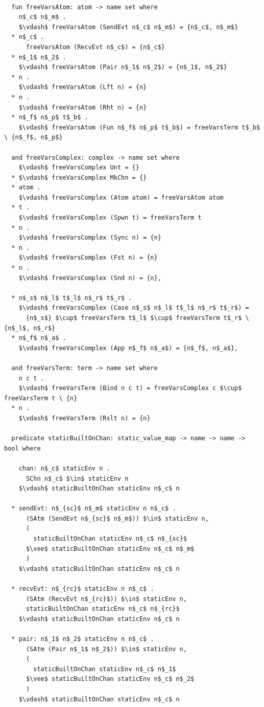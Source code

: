 \documentclass[letterpaper, 11pt]{report}
\begin{document}
\begin{lstlisting}[language=logic, mathescape]

  fun freeVarsAtom: atom -> name set where
    n$_c$ n$_m$ .
    $\vdash$ freeVarsAtom (SendEvt n$_c$ n$_m$) = {n$_c$, n$_m$}
  * n$_c$ .
      freeVarsAtom (RecvEvt n$_c$) = {n$_c$}
  * n$_1$ n$_2$ .
    $\vdash$ freeVarsAtom (Pair n$_1$ n$_2$) = {n$_1$, n$_2$}
  * n .
    $\vdash$ freeVarsAtom (Lft n) = {n}
  * n .
    $\vdash$ freeVarsAtom (Rht n) = {n}
  * n$_f$ n$_p$ t$_b$ .
    $\vdash$ freeVarsAtom (Fun n$_f$ n$_p$ t$_b$) = freeVarsTerm t$_b$ \ {n$_f$, n$_p$}
  
  and freeVarsComplex: complex -> name set where
    $\vdash$ freeVarsComplex Unt = {}
  * $\vdash$ freeVarsComplex MkChn = {}
  * atom .
    $\vdash$ freeVarsComplex (Atom atom) = freeVarsAtom atom
  * t .
    $\vdash$ freeVarsComplex (Spwn t) = freeVarsTerm t
  * n .
    $\vdash$ freeVarsComplex (Sync n) = {n}
  * n .
    $\vdash$ freeVarsComplex (Fst n) = {n}
  * n .
    $\vdash$ freeVarsComplex (Snd n) = {n},

  * n$_s$ n$_l$ t$_l$ n$_r$ t$_r$ .
    $\vdash$ freeVarsComplex (Case n$_s$ n$_l$ t$_l$ n$_r$ t$_r$) = 
      {n$_s$} $\cup$ freeVarsTerm t$_l$ $\cup$ freeVarsTerm t$_r$ \ {n$_l$, n$_r$}
  * n$_f$ n$_a$ .
    $\vdash$ freeVarsComplex (App n$_f$ n$_a$) = {n$_f$, n$_a$},
  
  and freeVarsTerm: term -> name set where
    n c t .
    $\vdash$ freeVarsTerm (Bind n c t) = freeVarsComplex c $\cup$ freeVarsTerm t \ {n}
  * n .
    $\vdash$ freeVarsTerm (Rslt n) = {n}

  predicate staticBuiltOnChan: static_value_map -> name -> name -> bool where

    chan: n$_c$ staticEnv n .
      SChn n$_c$ $\in$ staticEnv n 
    $\vdash$ staticBuiltOnChan staticEnv n$_c$ n

  * sendEvt: n$_{sc}$ n$_m$ staticEnv n n$_c$ . 
      (SAtm (SendEvt n$_{sc}$ n$_m$)) $\in$ staticEnv n,
      (
        staticBuiltOnChan staticEnv n$_c$ n$_{sc}$ 
      $\vee$ staticBuiltOnChan staticEnv n$_c$ n$_m$
      )
    $\vdash$ staticBuiltOnChan staticEnv n$_c$ n

  * recvEvt: n$_{rc}$ staticEnv n n$_c$ . 
      (SAtm (RecvEvt n$_{rc}$)) $\in$ staticEnv n,
      staticBuiltOnChan staticEnv n$_c$ n$_{rc}$
    $\vdash$ staticBuiltOnChan staticEnv n$_c$ n

  * pair: n$_1$ n$_2$ staticEnv n n$_c$ . 
      (SAtm (Pair n$_1$ n$_2$)) $\in$ staticEnv n,
      (
        staticBuiltOnChan staticEnv n$_c$ n$_1$ 
      $\vee$ staticBuiltOnChan staticEnv n$_c$ n$_2$
      )
    $\vdash$ staticBuiltOnChan staticEnv n$_c$ n


\end{lstlisting}
\end{document}
